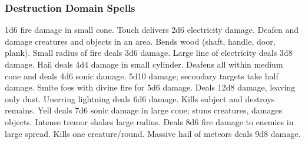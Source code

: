\subsubsection{Destruction Domain Spells}
\begin{spelllist}
   1d6 fire damage in small cone.
   Touch delivers 2d6 electricity damage.
   Deafen and damage creatures and objects in an area. 
   Bends wood (shaft, handle, door, plank).
   Small radius of fire deals 3d6 damage.
   Large line of electricity deals 3d8 damage.
   Hail deals 4d4 damage in small cylinder.
   Deafens all within medium cone and deals 4d6 sonic damage.
   5d10 damage; secondary targets take half damage.
   Smite foes with divine fire for 5d6 damage.
   Deals 12d8 damage, leaving only dust.
   Unerring lightning deals 6d6 damage.
  \F Kills subject and destroys remains.
   Yell deals 7d6 sonic damage in large cone; stuns creatures, damages objects.
   Intense tremor shakes large radius.
   Deals 8d6 fire damage to enemies in large spread.
   Kills one creature/round.
   Massive hail of meteors deals 9d8 damage.
\end{spelllist}

